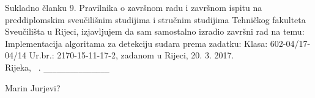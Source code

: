 

{ \large 
\vspace{15pt}
Sukladno članku 9. Pravilnika o završnom radu i završnom ispitu na
preddiplomskim sveučilišnim studijima i stručnim studijima Tehničkog fakulteta
Sveučilišta u Rijeci, izjavljujem
da sam samostalno izradio završni rad na temu: Implementacija algoritama za detekciju sudara
prema zadatku: Klasa: 602-04/17-04/14
Ur.br.: 2170-15-11-17-2, zadanom u Rijeci, 20. 3. 2017. \vspace{7cm} \\ 

\noindent Rijeka, \MONTH~\thisyear.   
\hspace{5.5cm}
	\verb|_______________|  %

\begin{flushright}
	\vspace{-15pt}
	Marin Jurjevi?
	\verb|      |   %
\end{flushright}

} %